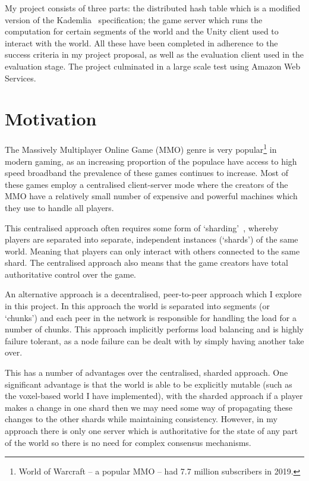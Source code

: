 \documentclass[10pt,twoside,notitlepage,a4paper]{report}
\begin{document}
	My project consists of three parts: the distributed hash table which is a modified version of the Kademlia~\cite{kademlia} specification; the game server which runs the computation for certain segments of the world and the Unity client used to interact with the world. All these have been completed in adherence to the success criteria in my project proposal, as well as the evaluation client used in the evaluation stage. The project culminated in a large scale test using Amazon Web Services.
	
	\section{Motivation}
	The Massively Multiplayer Online Game (MMO) genre is very popular\footnote{World of Warcraft -- a popular MMO -- had 7.7 million subscribers in 2019.} in modern gaming, as an increasing proportion of the populace have access to high speed broadband the prevalence of these games continues to increase. Most of these games employ a centralised client-server mode where the creators of the MMO have a relatively small number of expensive and powerful machines which they use to handle all players.
	
	This centralised approach often requires some form of `sharding'~\cite{shard}, whereby players are separated into separate, independent instances (`shards') of the same world. Meaning that players can only interact with others connected to the same shard. The centralised approach also means that the game creators have total authoritative control over the game.
	
	An alternative approach is a decentralised, peer-to-peer approach which I explore in this project. In this approach the world is separated into segments (or `chunks') and each peer in the network is responsible for handling the load for a number of chunks. This approach implicitly performs load balancing and is highly failure tolerant, as a node failure can be dealt with by simply having another take over.
	
	This has a number of advantages over the centralised, sharded approach. One significant advantage is that the world is able to be explicitly mutable (such as the voxel-based world I have implemented), with the sharded approach if a player makes a change in one shard then we may need some way of propagating these changes to the other shards while maintaining consistency. However, in my approach there is only one server which is authoritative for the state of any part of the world so there is no need for complex consensus mechanisms.
	
\end{document}
